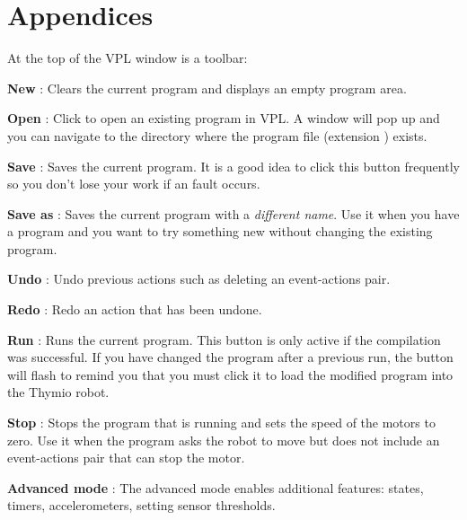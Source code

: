 \part{Appendices}

\label{a.toolbar}

At the top of the VPL window is a toolbar:

\begin{center}
\end{center}

\bigskip

\textbf{New} : Clears the current program and displays an
empty program area.

\bigskip

\textbf{Open} : Click to open an existing program in VPL. A
window will pop up and you can navigate to the directory where the
program file (extension ) exists.

\bigskip

\textbf{Save} : Saves the current program. It is a good idea
to click this button frequently so you don't lose your work if an fault
occurs.

\bigskip

\textbf{Save as} : Saves the current program with a
\emph{different name}. Use it when you have a program and you want to
try something new without changing the existing program.

\bigskip

\textbf{Undo} : Undo previous actions such as deleting
an event-actions pair.\label{p.undo}

\bigskip

\textbf{Redo} : Redo an action that has been undone.

\bigskip

\textbf{Run} : Runs the current program. This button is only
active if the compilation was successful. If you have changed the
program after a previous run, the button will flash to remind you that
you must click it to load the modified program into the Thymio robot.

\bigskip

\textbf{Stop} : Stops the program that is running and sets
the speed of the motors to zero. Use it when the program asks the robot
to move but does not include an event-actions pair that can stop the
motor.

\textbf{Advanced mode} : The advanced mode enables
additional features: states, timers, accelerometers, setting sensor
thresholds.

